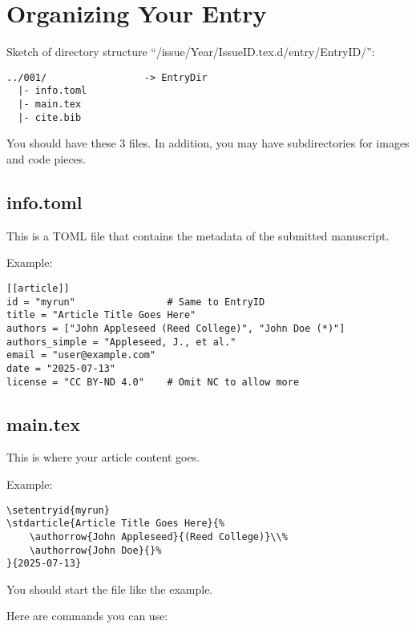 \section{Organizing Your Entry}
Sketch of directory structure ``/issue/Year/IssueID.tex.d/entry/EntryID/'':

\begin{lstlisting}
../001/                 -> EntryDir
  |- info.toml
  |- main.tex
  |- cite.bib
\end{lstlisting}

You should have these 3 files.
In addition, you may have subdirectories for images and code pieces.

\subsection{info.toml}
This is a TOML file that contains the metadata of the submitted manuscript.

Example:
\begin{lstlisting}
[[article]]
id = "myrun"                # Same to EntryID
title = "Article Title Goes Here"
authors = ["John Appleseed (Reed College)", "John Doe (*)"]
authors_simple = "Appleseed, J., et al."
email = "user@example.com"
date = "2025-07-13"
license = "CC BY-ND 4.0"    # Omit NC to allow more
\end{lstlisting}

\subsection{main.tex}
This is where your article content goes.

Example:
\begin{lstlisting}
\setentryid{myrun}
\stdarticle{Article Title Goes Here}{%
    \authorrow{John Appleseed}{(Reed College)}\\%
    \authorrow{John Doe}{}%
}{2025-07-13}
\end{lstlisting}

You should start the file like the example.

Here are commands you can use:

